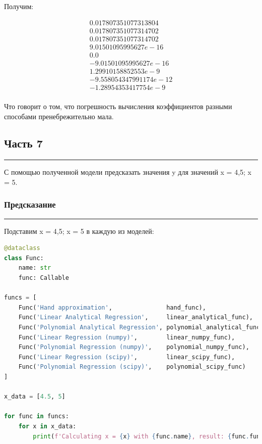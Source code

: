 \documentclass[a4paper, 14pt]{extarticle}
\begin{document}
Получим:

\begin{gather*}
    0.017807351077313804\\
    0.017807351077314702\\
    0.017807351077314702\\[2em]
    9.01501095995627e-16\\
    0.0\\
    -9.01501095995627e-16\\[2em]
    1.29910158852553e-9\\
    -9.558054347991174e-12\\
    -1.28954353417754e-9\\
\end{gather*}

Что говорит о том, что погрешность вычисления коэффициентов разными способами пренебрежительно мала.

\newpage

\subsection*{{Часть 7}}\vspace{-20pt}\rule{\linewidth}{0.1mm}

С помощью полученной модели предсказать значения y для значений x = 4,5; x = 5.

\subsubsection*{{Предсказание}}\vspace{-20pt}\rule{\linewidth}{0.1mm}

Подставим x = 4,5; x = 5 в каждую из моделей:

\begin{center}
    \begin{lstlisting}[language=Python]
@dataclass
class Func:
    name: str
    func: Callable

funcs = [
    Func('Hand approximation',               hand_func),
    Func('Linear Analytical Regression',     linear_analytical_func),
    Func('Polynomial Analytical Regression', polynomial_analytical_func),
    Func('Linear Regression (numpy)',        linear_numpy_func),
    Func('Polynomial Regression (numpy)',    polynomial_numpy_func),
    Func('Linear Regression (scipy)',        linear_scipy_func),
    Func('Polynomial Regression (scipy)',    polynomial_scipy_func)
]

x_data = [4.5, 5]

for func in funcs:
    for x in x_data:
        print(f'Calculating x = {x} with {func.name}, result: {func.func(x)}')
    \end{lstlisting}
\end{center}
\end{document}
